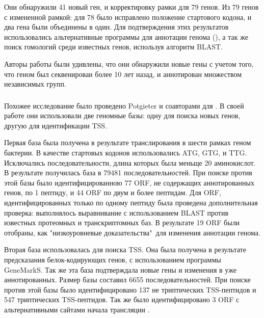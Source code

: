 Они обнаружили 41 новый ген, и корректировку рамки для 79 генов. Из 79 генов с измененной рамкой: для 78 было исправлено положение стартового кодона, и два гена были объединены в один. Для подтверждения этих результатов использовались альтернативные программы для аннотации генома (), а так же поиск гомологий среди известных генов, используя алгоритм BLAST. 

Авторы работы были удивлены, что они обнаружили новые гены с учетом того, что геном был секвенирован более 10 лет назад, и аннотирован множеством независимых групп.

\subsubsection{}
Похожее исследование было проведено Potgieter и соавторами для . В своей работе они использовали две геномные базы: одну для поиска новых генов, другую для идентификации TSS. 

Первая база была получена в результате транслирования в шести рамках геном бактерии. В качестве стартовых кодонов использовались ATG, GTG, и TTG. Исключались последовательности, длина которых была меньще 20 аминокислот. В результате получилась база в 79481 последовательностей. При поиске против этой базы было идентифицированною 77 ORF, не содержащих аннотированных генов, по 1 пептиду, и 44 ORF по двум и более пептидам. Для ORF, идентифицированных только по одному пептиду была проведена дополнительная проверка: выполнялось выравнивание с использованием BLAST против известных протеомных и транскриптомных баз. В результате 19 ORF были отобраны, как "низкоуровневые доказательства"\ для изменения аннотации генома.

Вторая база использовалась для поиска TSS. Она была получена в результате  предсказания белок-кодирующих генов, с использованием программы GeneMarkS. Так же эта база подтверждала новые гены и изменения в уже аннотированных. Размер базы составил 6655 последовательностей. При поиске против этой базы было идентифицировано 137 не триптических TSS-пептидов и 547 триптических TSS-пептидов. Так же было идентифицировано 3 ORF с альтернативными сайтами начала трансляции \cite{potgieter2016proteogenomic}. 



\newpage
